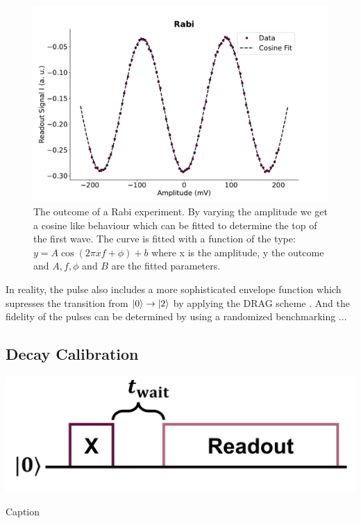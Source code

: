 \begin{figure}
    \centering
    \includegraphics{Calibrations/Figures/Rabi.pdf}
    \caption{The outcome of a Rabi experiment. By varying the amplitude we get a cosine like behaviour which can be fitted to determine the top of the first wave. The curve is fitted with a function of the type: $y = A \cos(2 \pi x f + \phi) + b$ where x is the amplitude, y the outcome and $A, f, \phi$ and $B$ are the fitted parameters.}
    \label{fig:calibration_rabi}
\end{figure}
\noindent
In reality, the pulse also includes a more sophisticated envelope function which supresses the transition from $\ket{0}\to\ket{2}$ by applying the DRAG scheme \cite{motzoi_simple_2009}. And the fidelity of the pulses can be determined by using a randomized benchmarking ... 


\subsection{Decay Calibration}\label{sec:calibration_t1}
\begin{marginfigure}
    \centering
    \includegraphics[]{Figs/circuits/t1.png}
    \caption{Caption}
    \label{fig:enter-label}
\end{marginfigure}

